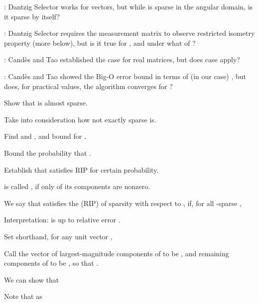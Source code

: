 {
\I {}: Dantzig Selector works for  vectors, but while  is sparse in the angular domain, is it sparse by itself?

\I {}: Dantzig Selector requires the measurement matrix to observe restricted isometry property (more below), but is it true for , and under what  of ?

\I {}: Cand\`es and Tao established the case for real matrices, but does  case apply?

\I {}: Cand\`es and Tao showed the Big-O error bound in terms of (in our case) , but does, for practical values, the algorithm converges for ?
}
{
\I Show that  is almost sparse.

\I Take into consideration how not exactly sparse  is.

\I Find  and , and bound  for .

\I Bound the probability that .

\I Establish that  satisfies RIP for certain probability.
}
{
\I {} is called , if only  of its components are nonzero.

\I We say that  satisfies the  (RIP) of sparsity  with respect to , if, for all -sparse ,

\I Interpretation:  is  up to relative error .

\I Set shorthand, for any unit vector ,
}
{
\I Call the vector of largest-magnitude  components of  to be , and remaining components of  to be , so that .

\I We can show that 

\I Note that  as 
}
